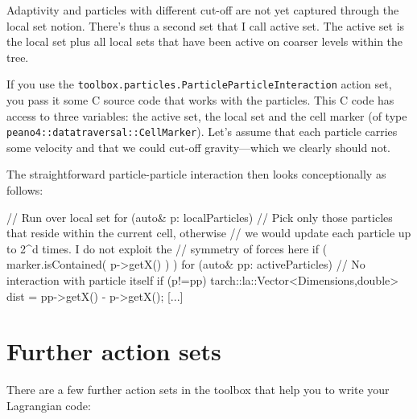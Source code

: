 Adaptivity and particles with different cut-off are not yet captured through the
local set notion.
There's thus a second set that I call active set. 
The active set is the local set plus all local sets that have been active on
coarser levels within the tree.


If you use the \texttt{toolbox.particles.ParticleParticleInteraction} action
set, you pass it some C source code that works with the particles.
This C code has access to three variables: the active set, the local set and the
cell marker (of type \linebreak \texttt{peano4::datatraversal::CellMarker}).
Let's assume that each particle carries some velocity and that we could cut-off
gravity---which we clearly should not.


The straightforward particle-particle interaction then looks conceptionally as
follows:

\begin{code}
// Run over local set
for (auto& p: localParticles) {
  // Pick only those particles that reside within the current cell, otherwise
  // we would update each particle up to 2^d times. I do not exploit the
  // symmetry of forces here
  if ( marker.isContained( p->getX() ) ) {
    for (auto& pp: activeParticles) {
      // No interaction with particle itself
      if (p!=pp) {
        tarch::la::Vector<Dimensions,double> dist = pp->getX() - p->getX();
        [...]
      }
    }
  }
}
\end{code}




\section{Further action sets}

There are a few further action sets in the toolbox that help you to write your
Lagrangian code:



